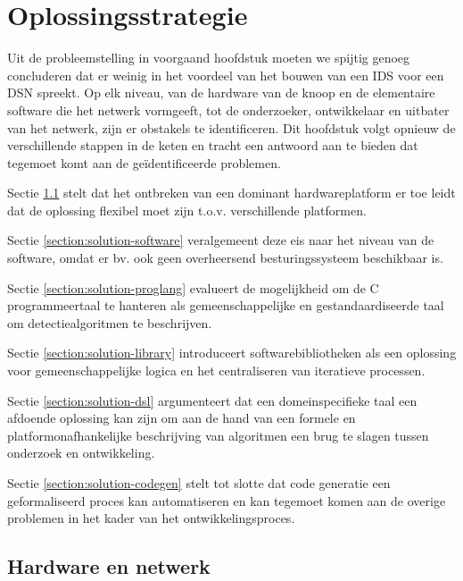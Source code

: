 
\chapter{Oplossingsstrategie}
\label{chapter:oplossingsstrategie}

Uit de probleemstelling in voorgaand hoofdstuk moeten we spijtig genoeg
concluderen dat er weinig in het voordeel van het bouwen van een IDS voor een
DSN spreekt. Op elk niveau, van de hardware van de knoop en de elementaire
software die het netwerk vormgeeft, tot de onderzoeker, ontwikkelaar en
uitbater van het netwerk, zijn er obstakels te identificeren. Dit hoofdstuk
volgt opnieuw de verschillende stappen in de keten en tracht een antwoord aan
te bieden dat tegemoet komt aan de ge\"identificeerde problemen.

Sectie \ref{section:solution-node-wsn} stelt dat het ontbreken van een dominant
hardwareplatform er toe leidt dat de oplossing flexibel moet zijn t.o.v.
verschillende platformen.

Sectie \ref{section:solution-software} veralgemeent deze eis naar het niveau
van de software, omdat er bv. ook geen overheersend besturingssysteem
beschikbaar is.

Sectie \ref{section:solution-proglang} evalueert de mogelijkheid om de C
programmeertaal te hanteren als gemeenschappelijke en gestandaardiseerde taal
om detectiealgoritmen te beschrijven.

Sectie \ref{section:solution-library} introduceert softwarebibliotheken als een
oplossing voor gemeenschappelijke logica en het centraliseren van iteratieve
processen.

Sectie \ref{section:solution-dsl} argumenteert dat een domeinspecifieke taal
een afdoende oplossing kan zijn om aan de hand van een formele en
platformonafhankelijke beschrijving van algoritmen een brug te slagen tussen
onderzoek en ontwikkeling.

Sectie \ref{section:solution-codegen} stelt tot slotte dat code generatie een
geformaliseerd proces kan automatiseren en kan tegemoet komen aan de overige
problemen in het kader van het ontwikkelingsproces.

\vspace{-3mm}

\section{Hardware en netwerk}
\label{section:solution-node-wsn}

